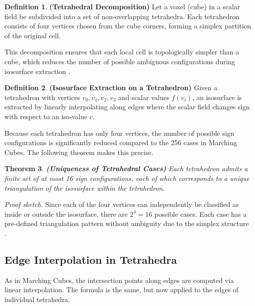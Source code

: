 \documentclass[12pt, a4paper, oneside]{book}
\theoremstyle{plain}
\newtheorem{theorem}{Theorem}[chapter]
\theoremstyle{definition}
\newtheorem{definition}[theorem]{Definition}
\theoremstyle{remark}
\theoremstyle{definition}
\begin{document}
\vspace{0.5em}

\begin{definition}
    \textbf{(Tetrahedral Decomposition)}
Let a voxel (cube) in a scalar field be subdivided into a set of non-overlapping
tetrahedra. Each tetrahedron consists of four vertices chosen from the cube corners,
forming a simplex partition of the original cell.
\end{definition}

This decomposition ensures that each local cell is topologically simpler than a cube,
which reduces the number of possible ambiguous configurations during isosurface extraction
\cite{shirley1990marching,bloomenthal1997introduction}.

\vspace{0.5em}

\begin{definition}
    \textbf{(Isosurface Extraction on a Tetrahedron)}
Given a tetrahedron with vertices $v_0, v_1, v_2, v_3$ and scalar values $f(v_i)$, an
isosurface is extracted by linearly interpolating along edges where the scalar field
changes sign with respect to an iso-value $c$.
\end{definition}

Because each tetrahedron has only four vertices, the number of possible sign
configurations is significantly reduced compared to the 256 cases in Marching Cubes. The
following theorem makes this precise.

\begin{theorem}
    \textbf{(Uniqueness of Tetrahedral Cases)}
Each tetrahedron admits a finite set of at most 16 sign configurations, each of which
corresponds to a unique triangulation of the isosurface within the tetrahedron.
\end{theorem}

\textit{Proof sketch.} Since each of the four vertices can independently be classified as
inside or outside the isosurface, there are $2^4 = 16$ possible cases. Each case has a
pre-defined triangulation pattern without ambiguity due to the simplex structure
\cite{treece1999regularised}.

\vspace{0.5em}

\subsection{Edge Interpolation in Tetrahedra}

As in Marching Cubes, the intersection points along edges are computed via linear
interpolation. The formula is the same, but now applied to the edges of individual
tetrahedra.
\end{document}
